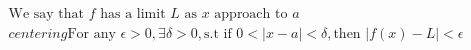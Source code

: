 \documentclass[preview]{standalone}
\begin{document}
\begin{align*}
{\text{We say that } f \text{ has a limit } L \text{ as } x \text{ approach to } a} \\centering\text{For any }\epsilon > 0, \exists \delta > 0, \text{s.t if } 0 < |x - a| < \delta, \text{then } |f(x) - L| < \epsilon
\end{align*}
\end{document}
